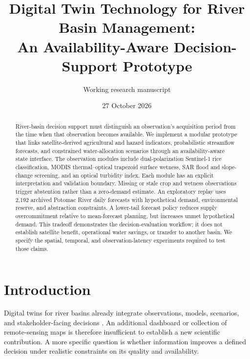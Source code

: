 \documentclass[11pt]{article}
\title{Digital Twin Technology for River Basin Management:\\
An Availability-Aware Decision-Support Prototype}
\author{Working research manuscript}
\date{27 October 2026}
\begin{document}
\maketitle
\begin{center}
\end{center}

\begin{abstract}
River-basin decision support must distinguish an observation's acquisition period from the time when that observation becomes available. We implement a modular prototype that links satellite-derived agricultural and hazard indicators, probabilistic streamflow forecasts, and constrained water-allocation scenarios through an availability-aware state interface. The observation modules include dual-polarization Sentinel-1 rice classification, MODIS thermal--optical trapezoid surface wetness, SAR flood and slope-change screening, and an optical turbidity index. Each module has an explicit interpretation and validation boundary. Missing or stale crop and wetness observations trigger abstention rather than a zero-demand estimate. An exploratory replay uses 2,192 archived Potomac River daily forecasts with hypothetical demand, environmental reserve, and abstraction constraints. A lower-tail forecast policy reduces supply overcommitment relative to mean-forecast planning, but increases unmet hypothetical demand. This tradeoff demonstrates the decision-evaluation workflow; it does not establish satellite benefit, operational water savings, or transfer to another basin. We specify the spatial, temporal, and observation-latency experiments required to test those claims.
\end{abstract}

\section{Introduction}
Digital twins for river basins already integrate observations, models, scenarios, and stakeholder-facing decisions \cite{yang,iwmi}. An additional dashboard or collection of remote-sensing maps is therefore insufficient to establish a new scientific contribution. A more specific question is whether information improves a defined decision under realistic constraints on its quality and availability.
\end{document}
